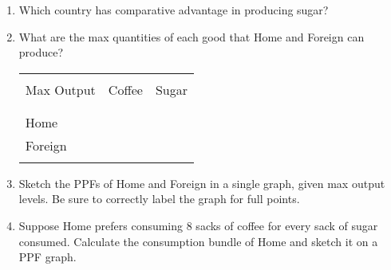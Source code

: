 \documentclass[12pt]{article}
\begin{document}
\begin{enumerate}[1)]

\item Which country has comparative advantage in producing sugar?

\newpage

\item What are the max quantities of each good that Home and Foreign can produce?

\vspace{2.0in}

\begin{table}[!h]
	\centering
	\begin{tabular}[t]{l c c }
		\hline
		&&\\
		Max Output & Coffee & Sugar  \\
		&&\\
		\hline
		&&\\
		Home &  &   \\
		Foreign &  &  \\
		&&\\
		\hline
	\end{tabular}
\end{table}

\item Sketch the PPFs of Home and Foreign in a single graph, given max output levels. Be sure to correctly label the graph for full points. 

\bigskip

\bigskip

\bigskip

\bigskip

\newpage

\item Suppose Home prefers consuming 8 sacks of coffee for every sack of sugar consumed. Calculate the consumption bundle of Home and sketch it on a PPF graph.

\bigskip

\bigskip

\bigskip

\bigskip

\bigskip

\bigskip

\bigskip

\bigskip

\bigskip

\bigskip

\bigskip

\bigskip

\bigskip


\end{enumerate}
\end{document}
